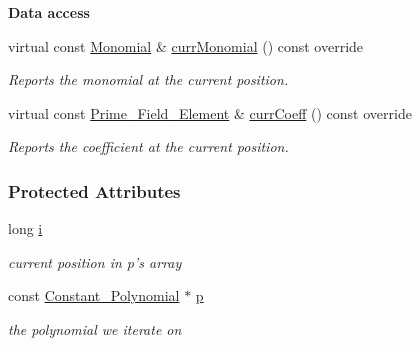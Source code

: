 \begin{Indent}\textbf{ Data access}\par
\begin{DoxyCompactItemize}
\item 
\mbox{\label{group___iterator_group_a0c010f1e921bc6180a29bb48abf34888}} 
virtual const \hyperlink{group__polygroup_class_monomial}{Monomial} \& \hyperlink{group___iterator_group_a0c010f1e921bc6180a29bb48abf34888}{curr\+Monomial} () const override
\begin{DoxyCompactList}\small\item\em Reports the monomial at the current position. \end{DoxyCompactList}\item 
\mbox{\label{group___iterator_group_a6b26740b4c82a20ebe4dba5226fc0072}} 
virtual const \hyperlink{group___fields_group_class_prime___field___element}{Prime\+\_\+\+Field\+\_\+\+Element} \& \hyperlink{group___iterator_group_a6b26740b4c82a20ebe4dba5226fc0072}{curr\+Coeff} () const override
\begin{DoxyCompactList}\small\item\em Reports the coefficient at the current position. \end{DoxyCompactList}\end{DoxyCompactItemize}
\end{Indent}
\subsubsection*{Protected Attributes}
\begin{DoxyCompactItemize}
\item 
\mbox{\label{group___iterator_group_ab321ce25d6477f96450100cdc41090a6}} 
long \hyperlink{group___iterator_group_ab321ce25d6477f96450100cdc41090a6}{i}
\begin{DoxyCompactList}\small\item\em current position in p's array \end{DoxyCompactList}\item 
\mbox{\label{group___iterator_group_a5eb1e51bcc01a9da6dffd950a3e1b1ca}} 
const \hyperlink{group__polygroup_class_constant___polynomial}{Constant\+\_\+\+Polynomial} $\ast$ \hyperlink{group___iterator_group_a5eb1e51bcc01a9da6dffd950a3e1b1ca}{p}
\begin{DoxyCompactList}\small\item\em the polynomial we iterate on \end{DoxyCompactList}\end{DoxyCompactItemize}



